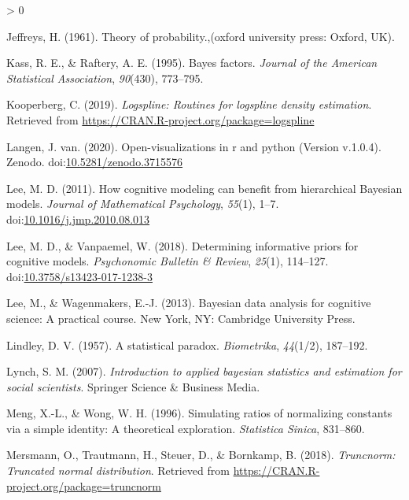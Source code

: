 \documentclass[
  english,
  doc,floatsintext]{apa6}
\newlength{\cslhangindent}
\newenvironment{CSLReferences}[2] %
 {%
  \setlength{\parindent}{0pt}
  \ifodd #1 \everypar{\setlength{\hangindent}{\cslhangindent}}\ignorespaces\fi
  \ifnum #2 > 0
  \setlength{\parskip}{#2\baselineskip}
  \fi
 }%
 {}
\begin{document}
\begin{CSLReferences}{1}{0}
\leavevmode\hypertarget{ref-jeffreys1961theory}{}%
Jeffreys, H. (1961). Theory of probability.,(oxford university press: Oxford, UK).

\leavevmode\hypertarget{ref-kass1995bayes}{}%
Kass, R. E., \& Raftery, A. E. (1995). Bayes factors. \emph{Journal of the American Statistical Association}, \emph{90}(430), 773--795.

\leavevmode\hypertarget{ref-logspline}{}%
Kooperberg, C. (2019). \emph{Logspline: Routines for logspline density estimation}. Retrieved from \url{https://CRAN.R-project.org/package=logspline}

\leavevmode\hypertarget{ref-j_van_langen_2020_3715576}{}%
Langen, J. van. (2020). Open-visualizations in r and python (Version v.1.0.4). Zenodo. doi:\href{https://doi.org/10.5281/zenodo.3715576}{10.5281/zenodo.3715576}

\leavevmode\hypertarget{ref-lee2011cognitive}{}%
Lee, M. D. (2011). How cognitive modeling can benefit from hierarchical {Bayesian} models. \emph{Journal of Mathematical Psychology}, \emph{55}(1), 1--7. doi:\href{https://doi.org/10.1016/j.jmp.2010.08.013}{10.1016/j.jmp.2010.08.013}

\leavevmode\hypertarget{ref-lee2018determining}{}%
Lee, M. D., \& Vanpaemel, W. (2018). Determining informative priors for cognitive models. \emph{Psychonomic Bulletin \& Review}, \emph{25}(1), 114--127. doi:\href{https://doi.org/10.3758/s13423-017-1238-3}{10.3758/s13423-017-1238-3}

\leavevmode\hypertarget{ref-lee2013bayesian}{}%
Lee, M., \& Wagenmakers, E.-J. (2013). Bayesian data analysis for cognitive science: A practical course. New York, NY: Cambridge University Press.

\leavevmode\hypertarget{ref-lindley1957statistical}{}%
Lindley, D. V. (1957). A statistical paradox. \emph{Biometrika}, \emph{44}(1/2), 187--192.

\leavevmode\hypertarget{ref-lynch2007introduction}{}%
Lynch, S. M. (2007). \emph{Introduction to applied bayesian statistics and estimation for social scientists}. Springer Science \& Business Media.

\leavevmode\hypertarget{ref-meng1996simulating}{}%
Meng, X.-L., \& Wong, W. H. (1996). Simulating ratios of normalizing constants via a simple identity: A theoretical exploration. \emph{Statistica Sinica}, 831--860.

\leavevmode\hypertarget{ref-R-truncnorm}{}%
Mersmann, O., Trautmann, H., Steuer, D., \& Bornkamp, B. (2018). \emph{Truncnorm: Truncated normal distribution}. Retrieved from \url{https://CRAN.R-project.org/package=truncnorm}


\end{CSLReferences}
\end{document}
